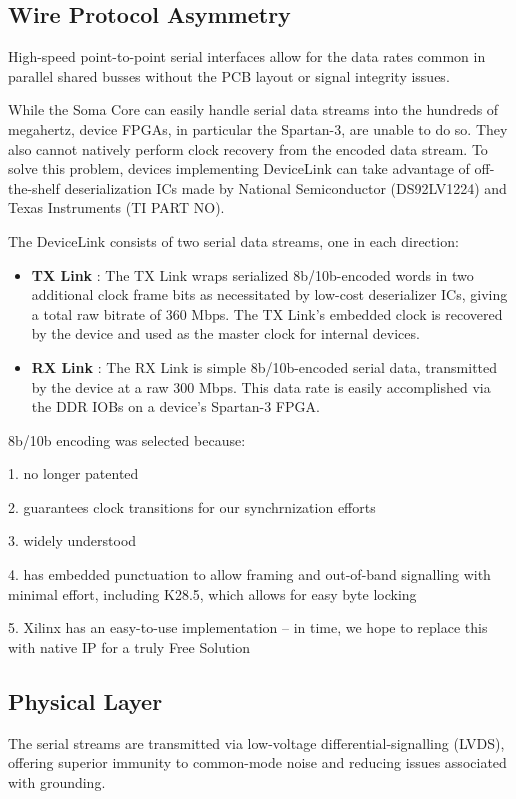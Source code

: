 

\subsection{Wire Protocol Asymmetry}

High-speed point-to-point serial interfaces allow for the data rates
common in parallel shared busses without the PCB layout or signal
integrity issues. 

While the Soma Core can easily handle serial data streams into the
hundreds of megahertz, device FPGAs, in particular the Spartan-3, are
unable to do so. They also cannot natively perform clock recovery from
the encoded data stream. To solve this problem, devices implementing
DeviceLink can take advantage of off-the-shelf deserialization ICs made
by National Semiconductor (DS92LV1224) and Texas Instruments (TI PART
NO).

The DeviceLink consists of two serial data streams, one in each direction: 
\begin{itemize}
\item \textbf{TX Link} : The TX Link wraps serialized 8b/10b-encoded
  words in two additional clock frame bits as necessitated by low-cost
  deserializer ICs, giving a total raw bitrate of 360 Mbps. The TX
  Link's embedded clock is recovered by the device and used as the
  master clock for internal devices.
\item \textbf{RX Link} : The RX Link is simple 8b/10b-encoded serial
  data, transmitted by the device at a raw 300 Mbps. This data rate is
  easily accomplished via the DDR IOBs on a device's Spartan-3 FPGA.
\end{itemize}


8b/10b encoding was selected because: 

1. no longer patented 

2. guarantees clock transitions for our synchrnization efforts

3. widely understood 

4. has embedded punctuation to allow framing and out-of-band
   signalling with minimal effort, including K28.5, which allows for
   easy byte locking

5. Xilinx has an easy-to-use implementation -- in time, we hope to
   replace this with native IP for a truly Free Solution

\subsection{Physical Layer}
The serial streams are transmitted via low-voltage
differential-signalling (LVDS), offering superior immunity to
common-mode noise and reducing issues associated with grounding. 

